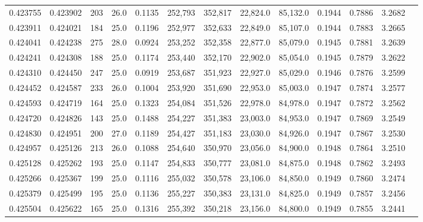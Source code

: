 \begin{tabular}{rrrrrrrrrrrrr}
0.423755 & 0.423902 &   203 & 26.0 &                                     0.1135 & 252,793 & 352,817 &  22,824.0 &  85,132.0 & 0.1944 & 0.7886 & 3.2682 \\
0.423911 & 0.424021 &   184 & 25.0 &                                     0.1196 & 252,977 & 352,633 &  22,849.0 &  85,107.0 & 0.1944 & 0.7883 & 3.2665 \\
0.424041 & 0.424238 &   275 & 28.0 &                                     0.0924 & 253,252 & 352,358 &  22,877.0 &  85,079.0 & 0.1945 & 0.7881 & 3.2639 \\
0.424241 & 0.424308 &   188 & 25.0 &                                     0.1174 & 253,440 & 352,170 &  22,902.0 &  85,054.0 & 0.1945 & 0.7879 & 3.2622 \\
0.424310 & 0.424450 &   247 & 25.0 &                                     0.0919 & 253,687 & 351,923 &  22,927.0 &  85,029.0 & 0.1946 & 0.7876 & 3.2599 \\
0.424452 & 0.424587 &   233 & 26.0 &                                     0.1004 & 253,920 & 351,690 &  22,953.0 &  85,003.0 & 0.1947 & 0.7874 & 3.2577 \\
0.424593 & 0.424719 &   164 & 25.0 &                                     0.1323 & 254,084 & 351,526 &  22,978.0 &  84,978.0 & 0.1947 & 0.7872 & 3.2562 \\
0.424720 & 0.424826 &   143 & 25.0 &                                     0.1488 & 254,227 & 351,383 &  23,003.0 &  84,953.0 & 0.1947 & 0.7869 & 3.2549 \\
0.424830 & 0.424951 &   200 & 27.0 &                                     0.1189 & 254,427 & 351,183 &  23,030.0 &  84,926.0 & 0.1947 & 0.7867 & 3.2530 \\
0.424957 & 0.425126 &   213 & 26.0 &                                     0.1088 & 254,640 & 350,970 &  23,056.0 &  84,900.0 & 0.1948 & 0.7864 & 3.2510 \\
0.425128 & 0.425262 &   193 & 25.0 &                                     0.1147 & 254,833 & 350,777 &  23,081.0 &  84,875.0 & 0.1948 & 0.7862 & 3.2493 \\
0.425266 & 0.425367 &   199 & 25.0 &                                     0.1116 & 255,032 & 350,578 &  23,106.0 &  84,850.0 & 0.1949 & 0.7860 & 3.2474 \\
0.425379 & 0.425499 &   195 & 25.0 &                                     0.1136 & 255,227 & 350,383 &  23,131.0 &  84,825.0 & 0.1949 & 0.7857 & 3.2456 \\
0.425504 & 0.425622 &   165 & 25.0 &                                     0.1316 & 255,392 & 350,218 &  23,156.0 &  84,800.0 & 0.1949 & 0.7855 & 3.2441 \\

\end{tabular}
